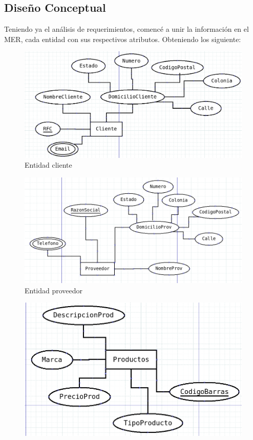 \documentclass[letter,12pt]{article}
\begin{document}
\subsection{Diseño Conceptual}
Teniendo ya el análisis de requerimientos, comencé a unir la información en el MER, cada entidad con sus respectivos atributos. Obteniendo los siguiente:
\begin{center}
\begin{figure}[H]
\includegraphics[scale=.4]{cliente.png}
\caption{Entidad cliente}
\end{figure}
\begin{figure}[H]
\includegraphics[scale=.45]{proveedor.png}
\caption{Entidad proveedor}
\end{figure}
\newpage
\begin{figure}[H]
\includegraphics[scale=.45]{productos.png}

\end{figure}
\end{center}
\end{document}
